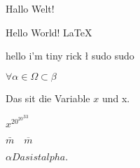 \documentclass{scrartcl}
\begin{document}
    Hallo Welt!
    \begin{flushright}
        Hello World! \LaTeX

        {\tiny hello i'm tiny rick} \l
        {\huge sudo sudo}
    \end{flushright}

    $\forall \alpha \in \Omega \subset \beta $

    Das sit die Variable $x$ und x.

    $x^{{20^{20}}^{33}}$

    $\bar{m} \quad \overline{m}$

    $\alpha Das ist alpha.$
\end{document}
